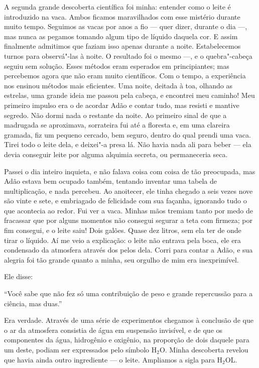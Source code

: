 A segunda grande descoberta científica foi minha: entender como o leite é
introduzido na vaca. Ambos ficamos maravilhados com esse mistério
durante muito tempo. Seguimos as vacas por anos a fio --- quer dizer, durante o dia ---,
mas nunca as pegamos tomando algum tipo de líquido daquela cor. E assim
finalmente admitimos que faziam isso apenas durante a noite. Estabelecemos turnos para
observá"-las à noite. O resultado foi o mesmo ---, e o quebra"-cabeça seguiu sem
solução. Esses métodos eram esperados em principiantes; mas percebemos
agora que não eram muito científicos. Com o tempo, a experiência nos ensinou 
métodos mais eficientes. Uma noite, deitada à toa, olhando as estrelas, uma grande
ideia me passou pela cabeça, e encontrei meu caminho! Meu primeiro impulso era o de
acordar Adão e contar tudo, mas resisti e mantive segredo. Não dormi nada
o restante da noite. Ao primeiro sinal de que a madrugada se aproximava,
sorrateira fui até a floresta e, em uma clareira gramada, fiz um pequeno
cercado, bem seguro, dentro do qual prendi uma vaca. Tirei todo o leite dela, e
deixei"-a presa lá. Não havia nada ali para beber --- ela devia conseguir
leite por alguma alquimia secreta, ou permaneceria seca.

Passei o dia inteiro inquieta, e não falava coisa com coisa de tão preocupada, mas
Adão estava bem ocupado também, tentando inventar uma tabela de multiplicação,
e nada percebeu. Ao anoitecer, ele tinha chegado a seis vezes nove são vinte e sete, e
embriagado de felicidade com sua façanha, ignorando tudo o que acontecia ao redor.
Fui ver a vaca. Minhas mãos tremiam tanto por medo de fracassar
que por alguns momentos não consegui segurar a teta com firmeza; por fim consegui,
e o leite saiu! Dois galões. Quase dez litros, sem ela ter de onde tirar o
líquido. Aí me veio a explicação: o leite não entrava pela boca, ele era
condensado da atmosfera através dos pelos dela. Corri para contar a Adão, e sua
alegria foi tão grande quanto a minha, seu orgulho de mim era inexprimível.

Ele disse:

“Você sabe que não fez só uma contribuição de peso e grande repercussão para a
ciência, mas duas.”

Era verdade. Através de uma série de experimentos chegamos à conclusão de que o
ar da atmosfera consistia de água em suspensão invisível, e de que os componentes da
água, hidrogênio e oxigênio, na proporção de dois daquele para um deste,
podiam ser expressados pelo símbolo H$_2$O. Minha descoberta revelou
que havia ainda outro ingrediente --- o leite. Ampliamos a sigla para
H$_2$OL.

